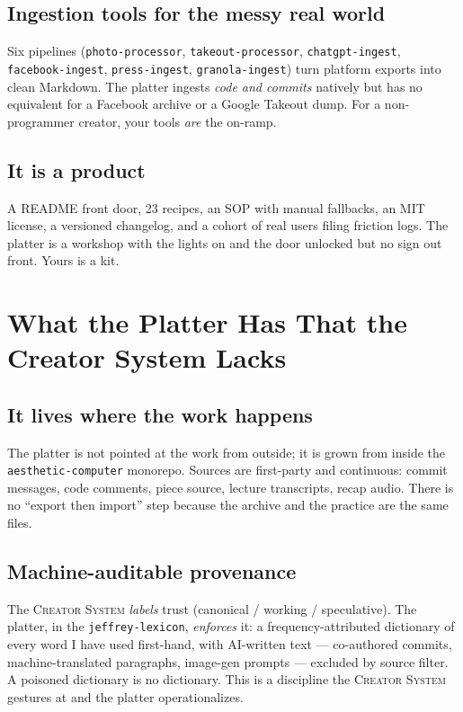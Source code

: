 \documentclass[10pt,letterpaper,twocolumn]{article}
\newcommand{\cs}{\textsc{Creator System}}
\begin{document}
\subsection{Ingestion tools for the messy real world}
Six pipelines (\texttt{photo-processor}, \texttt{takeout-processor}, \texttt{chatgpt-ingest}, \texttt{facebook-ingest}, \texttt{press-ingest}, \texttt{granola-ingest}) turn platform exports into clean Markdown. The platter ingests \emph{code and commits} natively but has no equivalent for a Facebook archive or a Google Takeout dump. For a non-programmer creator, your tools \emph{are} the on-ramp.

\subsection{It is a product}
A README front door, 23 recipes, an SOP with manual fallbacks, an MIT license, a versioned changelog, and a cohort of real users filing friction logs. The platter is a workshop with the lights on and the door unlocked but no sign out front. Yours is a kit.


\section{What the Platter Has That the Creator System Lacks}
\label{sec:ac-only}

\subsection{It lives where the work happens}
The platter is not pointed at the work from outside; it is grown from inside the \texttt{aesthetic-computer} monorepo. Sources are first-party and continuous: commit messages, code comments, piece source, lecture transcripts, recap audio. There is no ``export then import'' step because the archive and the practice are the same files.

\subsection{Machine-auditable provenance}
The \cs{} \emph{labels} trust (canonical / working / speculative). The platter, in the \texttt{jeffrey-lexicon}, \emph{enforces} it: a frequency-attributed dictionary of every word I have used first-hand, with AI-written text --- co-authored commits, machine-translated paragraphs, image-gen prompts --- excluded by source filter. A poisoned dictionary is no dictionary. This is a discipline the \cs{} gestures at and the platter operationalizes.
\end{document}
